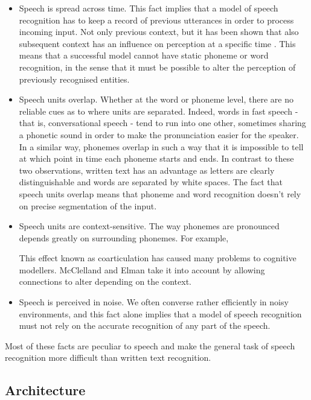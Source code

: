 \begin{itemize}
\item Speech is spread across time. This fact implies that a model of speech recognition has to keep a record of previous utterances in order to process incoming input. Not only previous context, but it has been shown that also subsequent context has an influence on perception at a specific time \citep{salasoo1985interaction} \citep{thompson1984word}. This means that a successful model cannot have static phoneme or word recognition, in the sense that it must be possible to alter the perception of previously recognised entities.

\item Speech units overlap. Whether at the word or phoneme level, there are no reliable cues as to where units are separated. Indeed, words in fast speech - that is, conversational speech - tend to run into one other, sometimes sharing a phonetic sound in order to make the pronunciation easier for the speaker. In a similar way, phonemes overlap in such a way that it is impossible to tell at which point in time each phoneme starts and ends. In contrast to these two observations, written text has an advantage as letters are clearly distinguishable and words are separated by white spaces. The fact that speech units overlap means that phoneme and word recognition doesn't rely on precise segmentation of the input.

\item Speech units are context-sensitive. The way phonemes are pronounced depends greatly on surrounding phonemes. For example, %

This effect known as coarticulation has caused many problems to cognitive modellers. McClelland and Elman take it into account by allowing connections to alter depending on the context.

\item Speech is perceived in noise. We often converse rather efficiently in noisy environments, 
and this fact alone implies that a model of speech recognition must not rely on the accurate recognition of any part of the speech.

\end{itemize}

Most of these facts are peculiar to speech and make the general task of speech recognition more difficult than written text recognition. 



\subsection{Architecture}

